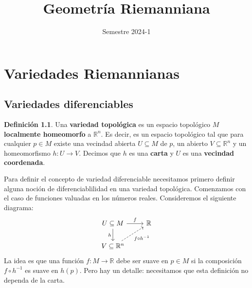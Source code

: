 \documentclass[spanish]{book}
\title{Geometría Riemanniana}
\author{Semestre 2024-1}
\renewcommand{\contentsname}{Índice}
\theoremstyle{definition}
\newtheorem*{defn}{Definición}
\newcommand{\R}{\mathbb{R}}
\begin{document}
\maketitle
{}
\addcontentsline{toc}{part}{\contentsname}
\tableofcontents

\chapter{Variedades Riemannianas}
\section{Variedades diferenciables}
\begin{defn}
	Una \textbf{variedad topológica} es un espacio topológico $M$ \textbf{localmente homeomorfo} a $\R^n$. Es decir, es un espacio topológico tal que para cualquier $p\in M$ existe una vecindad abierta $U\subseteq M$ de $p$, un abierto $V\subseteq\R^n$ y un  homeomorfismo $h:U\to V$. Decimos que $h$ es una \textbf{carta} y $U$ es una \textbf{vecindad coordenada}.
\end{defn}
Para definir el concepto de variedad diferenciable necesitamos primero definir alguna noción de diferenciablilidad en una variedad topológica. Comenzamos con el caso de funciones valuadas en los números reales. Consideremos el siguiente diagrama:
\[\begin{tikzcd}
	U\subseteq M\arrow{r}{f} \arrow{d}[swap]{h} & \mathbb{R} \\
	V \subseteq \mathbb{R}^n \arrow[swap,dashed]{ur}{f \circ h^{-1}} 
\end{tikzcd}\]
La idea es que una función $f:M\to\R$ debe ser suave en $p\in M$ si la composición $f\circ h^{-1}$ es suave en $h(p)$. Pero hay un detalle: necesitamos que esta definición no dependa de la carta.
\end{document}
